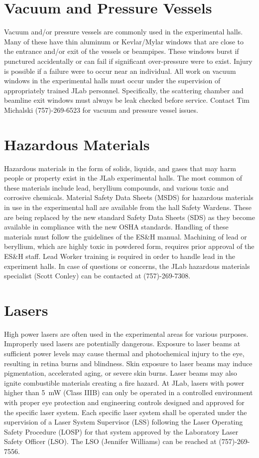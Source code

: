 \documentclass[12pt]{report}
\begin{document}
\section{Vacuum and Pressure Vessels}

Vacuum and/or pressure vessels are commonly used in the experimental halls. Many 
of these have thin aluminum or Kevlar/Mylar windows that are close to the entrance 
and/or exit of the vessels or beampipes. These windows burst if punctured accidentally 
or can fail if significant over-pressure were to exist. Injury is possible if a failure 
were to occur near an individual. All work on vacuum windows in the experimental halls 
must occur under the supervision of appropriately trained JLab personnel. Specifically, 
the scattering chamber and beamline exit windows must always be leak checked before 
service. Contact Tim Michalski (757)-269-6523 for vacuum and pressure vessel issues.

\section{Hazardous Materials}

Hazardous materials in the form of solids, liquids, and gases that may harm people or 
property exist in the JLab experimental halls. The most common of these materials 
include lead, beryllium compounds, and various toxic and corrosive chemicals. Material 
Safety Data Sheets (MSDS) for hazardous materials in use in the experimental hall are 
available from the hall Safety Wardens. These are being replaced by the new standard
Safety Data Sheets (SDS) as they become available in compliance with the new OSHA 
standards. Handling of these materials must follow the guidelines of the ES\&H manual. 
Machining of lead or beryllium, which are highly toxic in powdered form, requires prior 
approval of the ES\&H staff. Lead Worker training is required in order to handle lead in 
the experiment halls. In case of questions or concerns, the JLab hazardous materials 
specialist (Scott Conley) can be contacted at (757)-269-7308.

\section{Lasers}

High power lasers are often used in the experimental areas for various purposes. Improperly 
used lasers are potentially dangerous. Exposure to laser beams at sufficient power levels 
may cause thermal and photochemical injury to the eye, resulting in retina burns and 
blindness. Skin exposure to laser beams may induce pigmentation, accelerated aging, or 
severe skin burns. Laser beams may also ignite combustible materials creating a fire hazard. 
At JLab, lasers with power higher than 5~mW (Class IIIB) can only be operated in a controlled 
environment with proper eye protection and engineering controls designed and approved for the 
specific laser system. Each specific laser system shall be operated under the supervision of 
a Laser System Supervisor (LSS) following the Laser Operating Safety Procedure (LOSP) for 
that system approved by the Laboratory Laser Safety Officer (LSO). The LSO (Jennifer Williams)
can be reached at (757)-269-7556.
%
%
\end{document}
